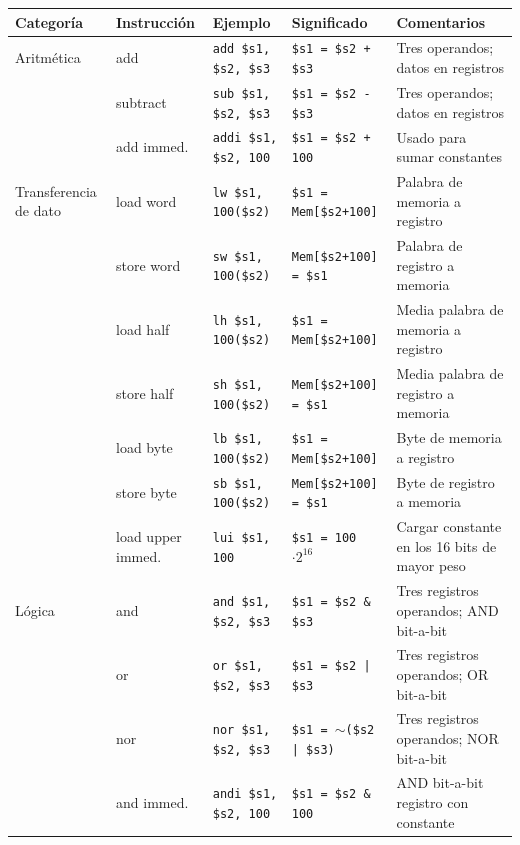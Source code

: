 \documentclass[12pt,a4paper]{article}
\begin{document}
	\begin{table}[h!]
		\centering
		\small
		\begin{tabularx}{\textwidth}{>{\raggedright\arraybackslash}p{2.2cm} >{\raggedright\arraybackslash}p{2.2cm} >{\raggedright\arraybackslash}p{3cm} >{\raggedright\arraybackslash}p{3.5cm} X}
			\toprule
			\textbf{Categoría} & \textbf{Instrucción} & \textbf{Ejemplo} & \textbf{Significado} & \textbf{Comentarios} \\
			\midrule
			Aritmética 
			& add & \texttt{add \$s1, \$s2, \$s3} & \texttt{\$s1 = \$s2 + \$s3} & Tres operandos; datos en registros \\
			& subtract & \texttt{sub \$s1, \$s2, \$s3} & \texttt{\$s1 = \$s2 - \$s3} & Tres operandos; datos en registros \\
			& add immed. & \texttt{addi \$s1, \$s2, 100} & \texttt{\$s1 = \$s2 + 100} & Usado para sumar constantes \\
			\midrule
			Transferencia de dato 
			& load word & \texttt{lw \$s1, 100(\$s2)} & \texttt{\$s1 = Mem[\$s2+100]} & Palabra de memoria a registro \\
			& store word & \texttt{sw \$s1, 100(\$s2)} & \texttt{Mem[\$s2+100] = \$s1} & Palabra de registro a memoria \\
			& load half & \texttt{lh \$s1, 100(\$s2)} & \texttt{\$s1 = Mem[\$s2+100]} & Media palabra de memoria a registro \\
			& store half & \texttt{sh \$s1, 100(\$s2)} & \texttt{Mem[\$s2+100] = \$s1} & Media palabra de registro a memoria \\
			& load byte & \texttt{lb \$s1, 100(\$s2)} & \texttt{\$s1 = Mem[\$s2+100]} & Byte de memoria a registro \\
			& store byte & \texttt{sb \$s1, 100(\$s2)} & \texttt{Mem[\$s2+100] = \$s1} & Byte de registro a memoria \\
			& load upper immed. & \texttt{lui \$s1, 100} & \texttt{\$s1 = 100 $\cdot 2^{16}$} & Cargar constante en los 16 bits de mayor peso \\
			\midrule
			Lógica 
			& and & \texttt{and \$s1, \$s2, \$s3} & \texttt{\$s1 = \$s2 \& \$s3} & Tres registros operandos; AND bit-a-bit \\
			& or & \texttt{or \$s1, \$s2, \$s3} & \texttt{\$s1 = \$s2 | \$s3} & Tres registros operandos; OR bit-a-bit \\
			& nor & \texttt{nor \$s1, \$s2, \$s3} & \texttt{\$s1 = $\sim$(\$s2 | \$s3)} & Tres registros operandos; NOR bit-a-bit \\
			& and immed. & \texttt{andi \$s1, \$s2, 100} & \texttt{\$s1 = \$s2 \& 100} & AND bit-a-bit registro con constante \\

\end{tabularx}
\end{table}
\end{document}
